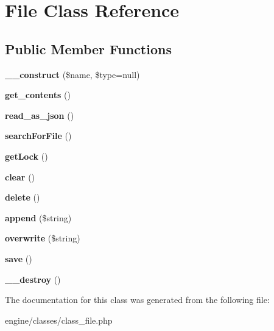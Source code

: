 \hypertarget{classFile}{\section{File Class Reference}
\label{classFile}
}
\subsection*{Public Member Functions}
\begin{DoxyCompactItemize}
\item 
\hypertarget{classFile_a7c30c00c75307f63ba64a6dfc51bdf40}{{\bfseries \-\_\-\-\_\-construct} (\$name, \$type=null)}\label{classFile_a7c30c00c75307f63ba64a6dfc51bdf40}

\item 
\hypertarget{classFile_a335b354b4bdc037234819672ef748a6a}{{\bfseries get\-\_\-contents} ()}\label{classFile_a335b354b4bdc037234819672ef748a6a}

\item 
\hypertarget{classFile_a690e235b49fc3edd286c06b8c3c45dc6}{{\bfseries read\-\_\-as\-\_\-json} ()}\label{classFile_a690e235b49fc3edd286c06b8c3c45dc6}

\item 
\hypertarget{classFile_aa5079110853e078baf343d4c14d008ef}{{\bfseries search\-For\-File} ()}\label{classFile_aa5079110853e078baf343d4c14d008ef}

\item 
\hypertarget{classFile_a54a61b7b4554eadc8152308e0ba818fa}{{\bfseries get\-Lock} ()}\label{classFile_a54a61b7b4554eadc8152308e0ba818fa}

\item 
\hypertarget{classFile_ab407397f208a0ea253b877f0ea35a224}{{\bfseries clear} ()}\label{classFile_ab407397f208a0ea253b877f0ea35a224}

\item 
\hypertarget{classFile_a0abbca3d8b81e29f01db75ec19d0ef84}{{\bfseries delete} ()}\label{classFile_a0abbca3d8b81e29f01db75ec19d0ef84}

\item 
\hypertarget{classFile_acf33002bc9fe7e7a2d965b7c2da6a153}{{\bfseries append} (\$string)}\label{classFile_acf33002bc9fe7e7a2d965b7c2da6a153}

\item 
\hypertarget{classFile_af75690cb66613f6086f7fa9a16b0a710}{{\bfseries overwrite} (\$string)}\label{classFile_af75690cb66613f6086f7fa9a16b0a710}

\item 
\hypertarget{classFile_ac2605a992d142fbb5b1dfcc214871e35}{{\bfseries save} ()}\label{classFile_ac2605a992d142fbb5b1dfcc214871e35}

\item 
\hypertarget{classFile_a5a5183f2549633a2804b24b8eee36e23}{{\bfseries \-\_\-\-\_\-destroy} ()}\label{classFile_a5a5183f2549633a2804b24b8eee36e23}

\end{DoxyCompactItemize}


The documentation for this class was generated from the following file\-:\begin{DoxyCompactItemize}
\item 
engine/classes/class\-\_\-file.\-php\end{DoxyCompactItemize}
